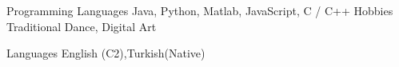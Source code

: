 

\begin{cvskills}

  \cvskill
    {Programming Languages} %
    {Java, Python, Matlab, JavaScript, C / C++ } %
  \cvskill
    {Hobbies} %
    {Traditional Dance, Digital Art}



  \cvskill
    {Languages} %
    {English (C2),Turkish(Native)} %

\end{cvskills}
